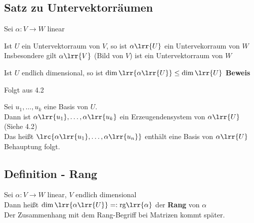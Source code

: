 \subsection{Satz zu Untervektorräumen}
	Sei $\alpha:V\rightarrow W$ linear
		\item Ist $U$ ein Untervektorraum von $V$, so ist $\alpha\lrr{U}$ ein Untervekorraum von $W$\\
			Insbesondere gilt $\alpha\lrr{V}$ (Bild von $V$) ist ein Untervektorraum von $W$
		\item Ist $U$ endlich dimensional, so ist $\dim\lrr{\alpha\lrr{U}}\leq\dim\lrr{U}$
	\subExEnd
	\textbf{Beweis}
		\item Folgt aus 4.2
		\item Sei $u_1,\dots,u_k$ eine Basis von $U$.\\
			Dann ist $\alpha\lrr{u_1},\dots,\alpha\lrr{u_k}$ ein Erzeugendensystem von $\alpha\lrr{U}$ (Siehe 4.2)\\
			Das heißt $\lrc{\alpha\lrr{u_1},\dots,\alpha\lrr{u_n}}$ enthält eine Basis von $\alpha\lrr{U}$ Behauptung folgt.
	\subExEnd
	
\subsection{Definition - Rang}
	Sei $\alpha:V\rightarrow W$ linear, $V$ endlich dimensional\\
	Dann heißt $\dim\lrr{\alpha\lrr{U}}=:\mbox{rg}\lrr{\alpha}$ der \textbf{Rang} von $\alpha$\\
	Der Zusammenhang mit dem Rang-Begriff bei Matrizen kommt später.
	
